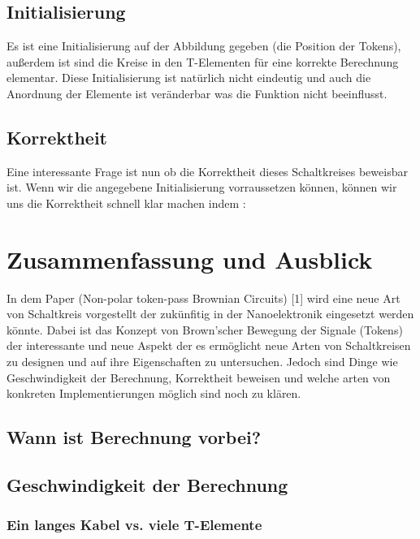 \subsection{Initialisierung}
Es ist eine Initialisierung auf der Abbildung gegeben (die Position der Tokens), 
außerdem ist sind die Kreise in den T-Elementen für eine korrekte Berechnung
elementar.
%
Diese Initialisierung ist natürlich nicht eindeutig und auch die Anordnung der Elemente 
ist veränderbar was die Funktion nicht beeinflusst.

\subsection{Korrektheit}
Eine interessante Frage ist nun ob die Korrektheit dieses Schaltkreises beweisbar ist. 
Wenn wir die angegebene Initialisierung vorraussetzen können, können wir uns die 
Korrektheit schnell klar machen indem :



\section{Zusammenfassung und Ausblick}
In dem Paper (Non-polar token-pass Brownian Circuits) [1] wird eine neue Art
von Schaltkreis vorgestellt der zukünfitig in der Nanoelektronik eingesetzt
werden könnte.
%
Dabei ist das Konzept von Brown'scher Bewegung der Signale (Tokens) 
der interessante und neue Aspekt der es ermöglicht neue Arten von Schaltkreisen 
zu designen und auf ihre Eigenschaften zu untersuchen.
%
Jedoch sind Dinge wie Geschwindigkeit der Berechnung, Korrektheit beweisen und 
welche arten von konkreten Implementierungen möglich sind noch zu klären.


\subsection{Wann ist Berechnung vorbei?}

\subsection{Geschwindigkeit der Berechnung}

\subsubsection{Ein langes Kabel vs. viele T-Elemente}

